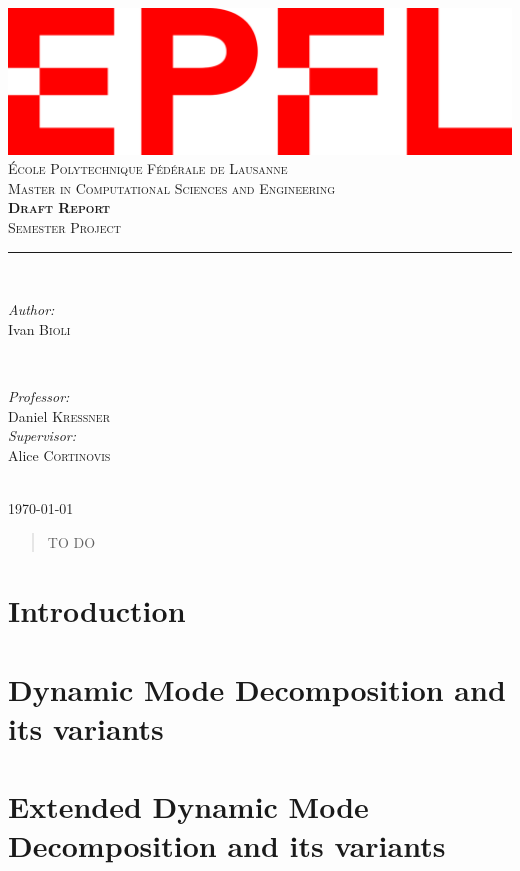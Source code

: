 \documentclass[11pt, a4paper]{report}
\begin{document}
\begin{titlepage}
	\centering
    \includegraphics[width=0.4\linewidth]{epfl.png}\\[0.5cm] 	%
    \textsc{\LARGE École Polytechnique Fédérale de Lausanne}\\
    [0.7 cm]
    \textsc{\LARGE Master in Computational Sciences and Engineering}\\
    \vspace{\fill}
    \textbf{\textsc{\fontsize{50}{50}\selectfont Draft Report}}\\ \vspace{\fill}		
	\textsc{\LARGE Semester Project}\\[0.4cm]
	\rule{\linewidth}{0.2 mm} \\[0.5 cm]
	\begin{minipage}{0.4\textwidth}
    \begin{flushleft} \large
    \emph{Author:}\\
    Ivan \textsc{Bioli} %
    \end{flushleft}
    \end{minipage}
    ~
    \begin{minipage}{0.4\textwidth}
    \begin{flushright} \large
    \emph{Professor:} \\
    Daniel \textsc{Kressner} \\
    \emph{Supervisor:} \\
    Alice \textsc{Cortinovis} \\
    \end{flushright}
    \end{minipage}\\
	[2cm] \Large{\today}
	
\end{titlepage}
\restoregeometry

\begin{abstract}
\thispagestyle{empty}
TO DO
\end{abstract}

\clearpage
\thispagestyle{empty}
\tableofcontents

\setcounter{page}{1}

\chapter{Introduction}


\chapter{Dynamic Mode Decomposition and its variants}


\chapter{Extended Dynamic Mode Decomposition and its variants}


\nocite{*}
\printbibliography
\end{document}
